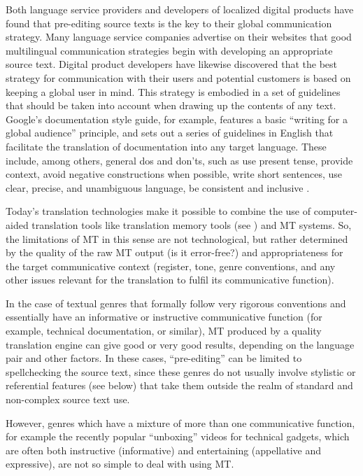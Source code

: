 \documentclass[output=paper,colorlinks,citecolor=brown,
]{langscibook}
\begin{document}
Both language service providers and developers of localized digital products have found that pre-editing source texts is the key to their global communication strategy. Many language service companies advertise on their websites that good multilingual communication strategies begin with developing an appropriate source text. Digital product developers have likewise discovered that the best strategy for communication with their users and potential customers is based on keeping a global user in mind. This strategy is embodied in a set of guidelines that should be taken into account when drawing up the contents of any text. Google’s documentation style guide, for example, features a basic “writing for a global audience” principle, and sets out a series of guidelines in English that facilitate the translation of documentation into any target language. These include, among others, general dos and don’ts, such as use present tense, provide context, avoid negative constructions when possible, write short sentences, use clear, precise, and unambiguous language, be consistent and inclusive \citep{Google2020}.

Today's translation technologies make it possible to combine the use of com\-put\-er-aided translation tools like translation memory tools (see ) and MT systems. So, the limitations of MT in this sense are not technological, but rather determined by the quality of the raw MT output (is it error-free?) and appropriateness for the target communicative context (register, tone, genre conventions, and any other issues relevant for the translation to fulfil its communicative function).

In the case of textual genres that formally follow very rigorous conventions and essentially have an informative or instructive communicative function (for example, technical documentation, or similar), MT produced by a quality translation engine can give good or very good results, depending on the language pair and other factors. In these cases, “pre-editing” can be limited to spellchecking the source text, since these genres do not usually involve stylistic or referential features (see below) that take them outside the realm of standard and non-complex source text use.


However, genres which have a mixture of more than one communicative function, for example the recently popular “unboxing” videos for technical gadgets, which are often both instructive (informative) and entertaining (appellative and expressive), are not so simple to deal with using MT. 
\end{document}
